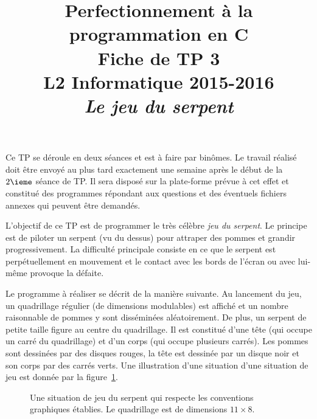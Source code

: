 \documentclass[11pt]{article}
\date{}
\title{{\bf Perfectionnement à la programmation en {\sf C}} \\
    Fiche de TP 3 \\
    {\small L2 Informatique 2015-2016} \\
    {\it \small Le jeu du serpent}}
\theoremstyle{definition}
\begin{document}
\maketitle

Ce TP se déroule en deux séances et est à faire par binômes. Le travail 
réalisé doit être envoyé au plus tard exactement une semaine après le 
début de la $2\ieme$ séance de TP. Il sera disposé sur la plate-forme 
prévue à cet effet et constitué des programmes répondant aux questions 
et des éventuels fichiers annexes qui peuvent être demandés.
\bigskip
\bigskip

L'objectif de ce TP est de programmer le très célèbre {\em jeu du serpent}.
Le principe est de piloter un serpent (vu du dessus) pour attraper des
pommes et grandir progressivement. La difficulté principale consiste en
ce que le serpent est perpétuellement en mouvement et le contact avec
les bords de l'écran ou avec lui-même provoque la défaite.
\medskip

Le programme à réaliser se décrit de la manière suivante. Au lancement
du jeu, un quadrillage régulier (de dimensions modulables) est affiché
et un nombre raisonnable de pommes y sont disséminées aléatoirement. De
plus, un serpent de petite taille figure au centre du quadrillage. Il est
constitué d'une tête (qui occupe un carré du quadrillage) et d'un corps
(qui occupe plusieurs carrés). Les pommes sont dessinées par des disques
rouges, la tête est dessinée par un disque noir et son corps par
des carrés verts. Une illustration d'une situation d'une situation
de jeu est donnée par la figure~\ref{fig:quadrillage}.
\begin{figure}[ht]
    \centering
    \caption{\footnotesize Une situation de jeu du serpent qui respecte 
    les conventions graphiques établies. Le quadrillage est de dimensions 
    $11 \times 8$.}
    \label{fig:quadrillage}
\end{figure}
\medskip
\end{document}
